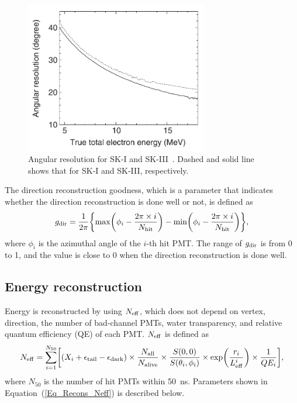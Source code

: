 \begin{figure}[tbp]
	\centering
	\includegraphics[width=8cm]{Figures/Reconstruction/Res_direction}
	\caption[Angular resolution for SK-I and SK-III]{
	Angular resolution for SK-I and SK-III~\cite{2011Abe}.
	Dashed and solid line shows that for SK-I and SK-III, respectively.
	}\label{Recons_Res_direction}
\end{figure}

\hs
The direction reconstruction goodness, which is a parameter that indicates whether the direction reconstruction is done well or not, is defined as
\begin{eqnarray}
	g_{\rm dir} = {1 \over 2\pi}\bigg\{{\rm max}\bigg(\phi_{i} - {2\pi \times i \over N_{\rm hit}}\bigg) - {\rm min}\bigg(\phi_{i} - {2\pi \times i \over N_{\rm hit}}\bigg)\bigg\},
\end{eqnarray}
where $\phi_{i}$ is the azimuthal angle of the $i$-th hit PMT.
The range of $g_{\rm dir}$ is from 0 to 1, and the value is close to 0 when the direction reconstruction is done well.





\subsection{Energy reconstruction}
\vs\hs
Energy is reconstructed by using $N_{\rm eff}$, which does not depend on vertex, direction, the number of bad-channel PMTs, water transparency, and relative quantum efficiency (QE) of each PMT.
$N_{\rm eff}$ is defined as
\begin{eqnarray}\label{Eq_Recons_Neff}
	N_{\rm eff} = \sum_{i=1}^{N_{50}} \biggl[(X_{i} + \epsilon_{\rm tail} - \epsilon_{\rm dark}) \times {N_{\rm all} \over N_{\rm alive}} \times {S(0,0) \over S(\theta_{i},\phi_{i})} \times \exp\biggl({r_{i} \over L_{\rm eff}^{i}}\biggr) \times {1 \over QE_{i}}\biggr],
\end{eqnarray}
where $N_{50}$ is the number of hit PMTs within 50~ns.
Parameters shown in Equation~(\ref{Eq_Recons_Neff}) is described below.\\

